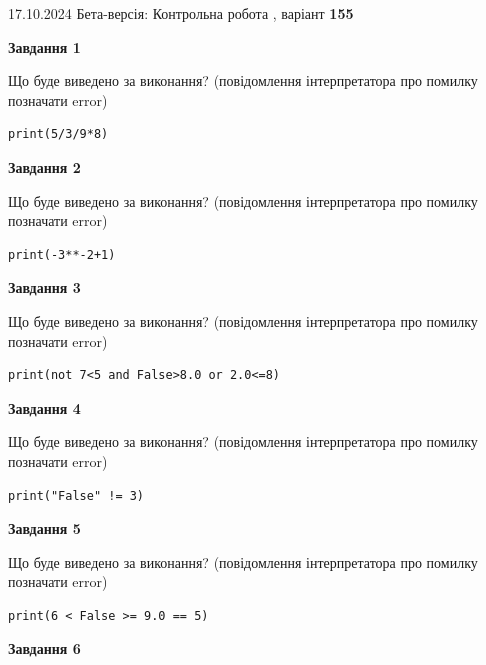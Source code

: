 \documentclass[12pt, ukrainian]{article}
\begin{document}
{\Large{17.10.2024 Бета-версія: Контрольна робота , варіант  \No \textbf { 155 }\par}}
{
\begin {large}
{\begin {center}\textbf{Завдання 1}\end {center}}

Що буде виведено за виконання? (повідомлення інтерпретатора про помилку позначати error)\par
\begin{verbatim}
print(5/3/9*8)
\end{verbatim}

{\begin {center}\textbf{Завдання 2}\end {center}}

Що буде виведено за виконання? (повідомлення інтерпретатора про помилку позначати error)\par
\begin{verbatim}
print(-3**-2+1)
\end{verbatim}

{\begin {center}\textbf{Завдання 3}\end {center}}

Що буде виведено за виконання? (повідомлення інтерпретатора про помилку позначати error)\par
\begin{verbatim}
print(not 7<5 and False>8.0 or 2.0<=8)
\end{verbatim}

{\begin {center}\textbf{Завдання 4}\end {center}}

Що буде виведено за виконання? (повідомлення інтерпретатора про помилку позначати error)\par
\begin{verbatim}
print("False" != 3)
\end{verbatim}

{\begin {center}\textbf{Завдання 5}\end {center}}

Що буде виведено за виконання? (повідомлення інтерпретатора про помилку позначати error)\par
\begin{verbatim}
print(6 < False >= 9.0 == 5)
\end{verbatim}

{\begin {center}\textbf{Завдання 6}\end {center}}


\end{large}}
\end{document}
